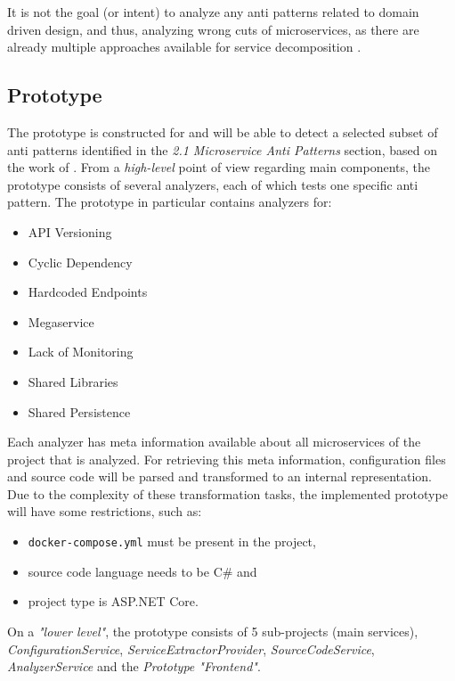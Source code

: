 \documentclass{article}
\begin{document}
It is not the goal (or intent) to analyze any anti patterns related to domain driven design, and thus, analyzing wrong cuts of microservices, as there are already multiple approaches available for service decomposition \cite{krause_microservice_2020, gysel_service_2016, baresi_microservices_2017}.

\subsection{Prototype}
The prototype is constructed for and will be able to detect a selected subset of anti patterns identified in the \textit{2.1 Microservice Anti Patterns} section, based on the work of \cite{taibi_definition_2018, taibi_microservices_2020, neri_design_2019, bogner_towards_2019}. From a \textit{high-level} point of view regarding main components, the prototype consists of several analyzers, each of which tests one specific anti pattern. The prototype in particular contains analyzers for:
\begin{itemize}
    \item API Versioning
    \item Cyclic Dependency
    \item Hardcoded Endpoints
    \item Megaservice
    \item Lack of Monitoring
    \item Shared Libraries
    \item Shared Persistence
\end{itemize}
Each analyzer has meta information available about all microservices of the project that is analyzed. For retrieving this meta information, configuration files and source code will be parsed and transformed to an internal representation. Due to the complexity of these transformation tasks, the implemented prototype will have some restrictions, such as:
\begin{itemize}
    \item \lstinline{docker-compose.yml} must be present in the project,
    \item source code language needs to be C\# and
    \item project type is ASP.NET Core.
\end{itemize}
On a \textit{"lower level"}, the prototype consists of 5 sub-projects (main services), \textit{ConfigurationService}, \textit{ServiceExtractorProvider}, \textit{SourceCodeService}, \textit{AnalyzerService} and the \textit{Prototype "Frontend"}. \newline
\end{document}
